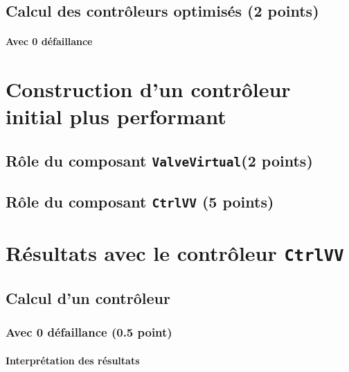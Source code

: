 \documentclass[a4paper]{book}
\begin{document}
\subsection{Calcul des contrôleurs optimisés (2 points)}


\paragraph{Avec 0 défaillance}


\section{Construction d'un contrôleur initial plus performant}
\subsection{Rôle du composant {\tt ValveVirtual}(2 points)}

\subsection{Rôle du composant {\tt CtrlVV} (5 points)}

\section{Résultats avec le contrôleur {\tt CtrlVV}}
\subsection{Calcul d'un contrôleur}
\subsubsection{Avec 0 défaillance (0.5 point)}



%
%
\paragraph{Interprétation des résultats}
\end{document}
